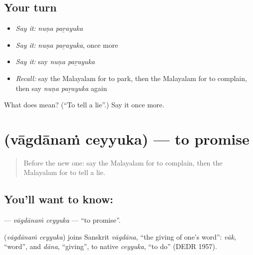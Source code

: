 \subsection*{Your turn}
\begin{itemize}
\raggedright
  \item \emph{Say it:} \emph{nuṇa paṟayuka}
  \item \emph{Say it:} \emph{nuṇa paṟayuka}, once more
  \item \emph{Say it:} say \emph{nuṇa paṟayuka}
  \item \emph{Recall:} say the Malayalam for to park, then the Malayalam for to complain, then say \emph{nuṇa paṟayuka} again
\end{itemize}

\begin{tcolorbox}[breakable,colback=teal!4,colframe=teal!35!black,title={Before you move on}]
What does   mean? (\textquotedblleft{}To tell a lie\textquotedblright{}.) Say it once more.
\end{tcolorbox}
\section[\texorpdfstring{\ml{വാഗ്ദാനം} \ml{ചെയ്യുക} (vāgdānaṁ ceyyuka)}{വാഗ്ദാനം ചെയ്യുക (vāgdānaṁ ceyyuka)}]{  (vāgdānaṁ ceyyuka) — to promise}

\label{lesson:ML-C228-vagdanam-ceyyuka}



\begin{quote}
Before the new one: say the Malayalam for to complain, then the Malayalam for to tell a lie.
\end{quote}

\subsection*{You'll want to know:  }
\textbf{ } — \emph{vāgdānaṁ ceyyuka} — \textquotedblleft{}to promise\textquotedblright{}.

\begin{cousinweb}
\textbf{ } (\emph{vāgdānaṁ ceyyuka}) joins Sanskrit \emph{vāgdāna}, \textquotedblleft{}the giving of one's word\textquotedblright{}: \emph{vāk}, \textquotedblleft{}word\textquotedblright{}, and \emph{dāna}, \textquotedblleft{}giving\textquotedblright{}, to native \emph{ceyyuka}, \textquotedblleft{}to do\textquotedblright{} (DEDR 1957).
\end{cousinweb}

